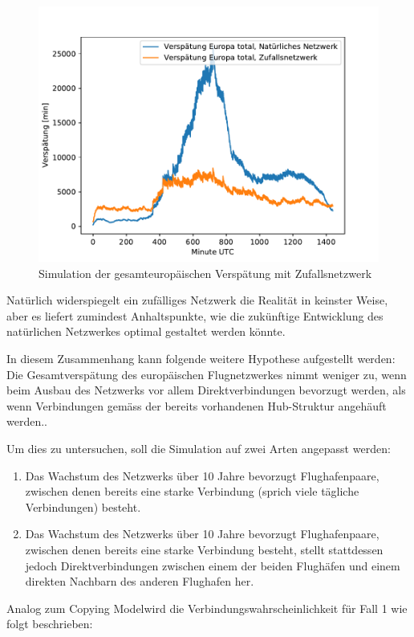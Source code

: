 \begin{figure}
    \centering
    \includegraphics[width=0.75\linewidth]{images/total_delay_random.pdf}
    \caption{Simulation der gesamteuropäischen Verspätung mit Zufallsnetzwerk}
    \label{fig:total-delay-random}
\end{figure}

Natürlich widerspiegelt ein zufälliges Netzwerk die Realität in keinster Weise, aber es liefert zumindest Anhaltspunkte,
wie die zukünftige Entwicklung des natürlichen Netzwerkes optimal gestaltet werden könnte.

In diesem Zusammenhang kann folgende weitere Hypothese aufgestellt werden: \guillemotleft Die Gesamtverspätung des
europäischen Flugnetzwerkes nimmt weniger zu, wenn beim Ausbau des Netzwerks vor allem Direktverbindungen
bevorzugt werden, als wenn Verbindungen gemäss der bereits vorhandenen Hub-Struktur angehäuft werden.\guillemotright.

Um dies zu untersuchen, soll die Simulation auf zwei Arten angepasst werden:
\begin{enumerate}
    \item Das Wachstum des Netzwerks über 10 Jahre bevorzugt Flughafenpaare, zwischen denen bereits eine starke Verbindung (sprich viele tägliche Verbindungen) besteht.
    \item Das Wachstum des Netzwerks über 10 Jahre bevorzugt Flughafenpaare, zwischen denen bereits eine starke Verbindung besteht, stellt stattdessen jedoch Direktverbindungen zwischen einem der beiden Flughäfen und einem direkten Nachbarn des anderen Flughafen her.
\end{enumerate}

Analog zum \guillemotleft Copying Model\guillemotright wird die Verbindungswahrscheinlichkeit für Fall 1 wie folgt beschrieben:


